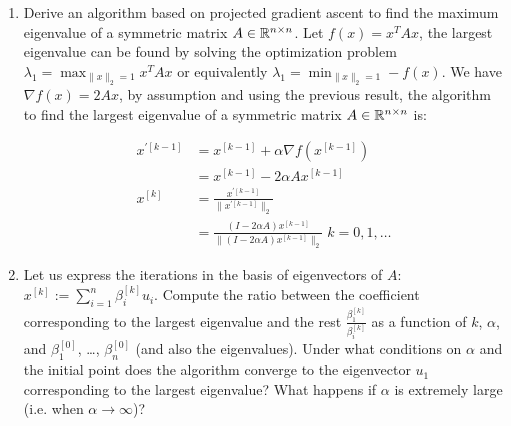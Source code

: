 \documentclass[12pt,twoside]{article}
\begin{document}
\begin{enumerate}
\begin{enumerate}
\item Derive an algorithm based on projected gradient ascent to find the maximum eigenvalue of a symmetric matrix $A\in \mathbb{R}^{n \times n}$.
Let $f(x) = x^T A x$, the largest eigenvalue can be found by solving the optimization problem $\lambda_1= \max _{\|x\|_2=1} x^T A x$ or equivalently $\lambda_1 = \min_{\|x\|_2=1}  - f(x)$.
We have $\nabla{f(x)} = 2 A x$, by assumption and using the previous result, the algorithm to find the largest eigenvalue of a symmetric matrix $A\in \mathbb{R}^{n \times n}$ is:

\begin{align*}
	x^{'[k-1]}	&= x^{[k-1]} + \alpha \nabla{f(x^{[k-1]} )} \\
			&= x^{[k-1]} -2 \alpha A x^{[k-1]} \\
	x^{[k]}	&= \frac{x^{'[k-1]}}{\|x^{'[k-1]}\|_2} \\
			&= \frac{(I - 2 \alpha A) x^{[k-1]}}{ \| (I - 2 \alpha A) x^{[k-1]} \|_2} \; k=0,1, \ldots
\end{align*}


\item Let us express the iterations in the basis of eigenvectors of $A$: $x^{[k]} := \sum_{i=1}^{n}\beta_i^{[k]} u_i$. Compute the ratio between the coefficient corresponding to the largest eigenvalue and the rest $\frac{\beta_1^{[k]}}{\beta_i^{[k]}}$ as a function of $k$, $\alpha$, and $\beta_1^{[0]}$, \ldots, $\beta_n^{[0]}$  (and also the eigenvalues). Under what conditions on $\alpha$ and the initial point does the algorithm converge to the eigenvector $u_1$ corresponding to the largest eigenvalue? What happens if $\alpha$ is extremely large (i.e. when $\alpha \rightarrow \infty$)?



\end{enumerate}
\end{enumerate}
\end{document}
